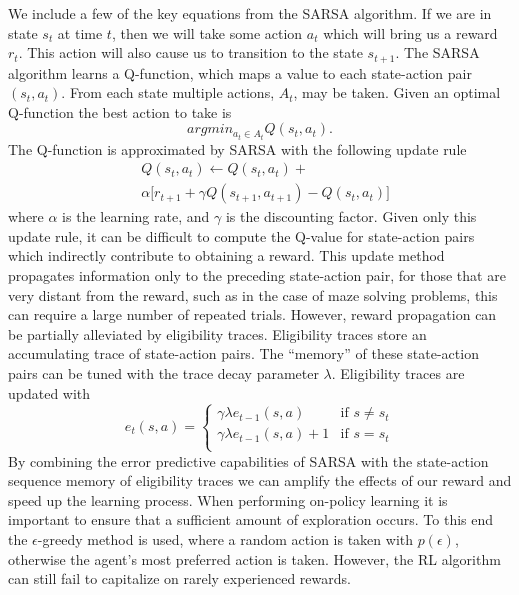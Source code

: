 We include a few of the key equations from the SARSA algorithm. If we are in state
$s_t$ at time $t$, then we will take some action $a_t$ which will bring us a
reward $r_t$. This action will also cause us to transition to the state
$s_{t+1}$. The SARSA algorithm learns a Q-function, which maps a value to each 
state-action pair $(s_t,a_t)$. From each state multiple actions, $A_t$, may be taken. Given an optimal Q-function the best action to take is
\begin{equation} argmin_{a_t \in A_t} Q(s_t,a_t).
\end{equation}
\noindent The Q-function is approximated by SARSA with the following update rule
\begin{eqnarray} 
& Q(s_t,a_t) \leftarrow Q(s_t,a_t)+ \nonumber \\ 
& \alpha \big[r_{t+1}+\gamma Q(s_{t+1},a_{t+1}) - Q(s_t,a_t)\big] 
\end{eqnarray}
\noindent where $\alpha$ is the learning rate, and $\gamma$ is the discounting
factor. Given only this update rule, it can be difficult to compute the Q-value
for state-action pairs which indirectly contribute to obtaining a reward. This
update method propagates information only to the preceding state-action pair,
for those that are very distant from the reward, such as in the case of maze
solving problems, this can require a large number of repeated trials. However,
 reward propagation can be partially alleviated by 
eligibility traces. Eligibility traces store an accumulating trace of
state-action pairs. The ``memory'' of these state-action pairs can be tuned with
the trace decay parameter $\lambda$. Eligibility traces are updated with
\begin{equation}
e_t(s,a) = 	\begin{cases}
			\gamma \lambda e_{t-1}(s,a) & \mbox{if } s \neq s_t \\ 
			\gamma \lambda e_{t-1}(s,a)+1 & \mbox{if }s = s_t \\
			\end{cases}
\end{equation} 
\noindent By combining the error predictive capabilities of SARSA with the
state-action sequence memory of eligibility traces we can amplify the effects
of our reward and speed up the learning process. When performing on-policy
learning it is important to ensure that a sufficient amount of exploration
occurs. To this end the $\epsilon$-greedy method is used, where a random
action is taken with $p(\epsilon)$, otherwise the agent's most preferred 
action is taken. However, the RL algorithm can still fail to capitalize on rarely
experienced rewards. 